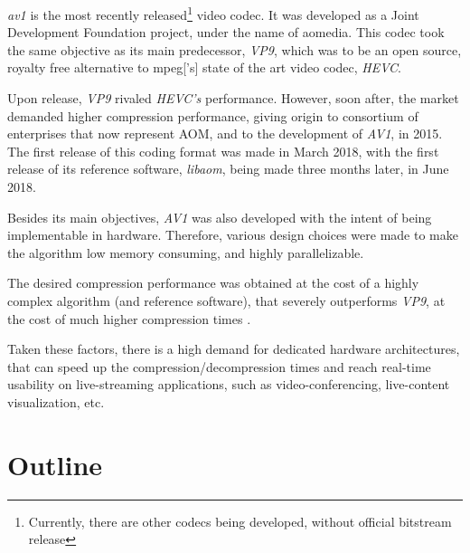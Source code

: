 \emph{\gls{av1}} is the most recently released\footnote{Currently, there are other codecs being developed, without official bitstream release} video codec. It was developed as a Joint Development Foundation \cite{JointDevelopmentFoundation} project, under the name of \gls{aomedia}. This codec took the same objective as its main predecessor, \textit{VP9}, which was to be an open source, royalty free alternative to \gls{mpeg}['s] state of the art video codec, \textit{\gls{HEVC}}.

Upon release, \textit{VP9} rivaled \textit{HEVC's} performance. However, soon after, the market demanded higher compression performance, giving origin to consortium of  enterprises that now represent AOM, and to the development of \textit{AV1}, in 2015. The first release of this coding format was made in March 2018, with the first release of its reference software, \textit{\gls{libaom}}, being made three months later, in June 2018.

Besides its main objectives, \textit{AV1} was also developed with the intent of being implementable in hardware. Therefore, various design choices were made to make the algorithm low memory consuming, and highly parallelizable. 

The desired compression performance was obtained at the cost of a highly complex algorithm (and reference software), that severely outperforms \textit{VP9}, at the cost of much higher compression times \cite{groisPerformanceComparisonAV12018}
.

Taken these factors, there is a high demand for dedicated hardware architectures, that can speed up the compression/decompression times and reach real-time usability on live-streaming applications, such as video-conferencing, live-content visualization, etc.



\section{Outline}


\printbibliography[heading=subbibliography]
